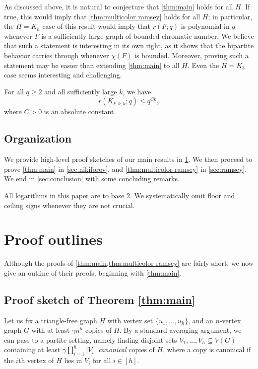 \documentclass[11pt]{article}
\numberwithin{equation}{section}
\theoremstyle{plain}
\theoremstyle{remark}
\newcommand\ab[1]{\lvert #1 \rvert}
\begin{document}
As discussed above, it is natural to conjecture that \cref{thm:main} holds for all $H$. If true, this would imply that \cref{thm:multicolor ramsey} holds for all $H$; in particular, the $H=K_h$ case of this result would imply that $r(F;q)$ is polynomial in $q$ whenever $F$ is a sufficiently large graph of bounded chromatic number. We believe that such a statement is interesting in its own right, as it shows that the bipartite behavior carries through whenever $\chi(F)$ is bounded. Moreover, proving such a statement may be easier than extending \cref{thm:main} to all $H$. Even the $H=K_3$ case seems interesting and challenging.
\begin{conjecture}
    For all $q \geq 2$ and all sufficiently large $k$, we have
    \[
        r(K_{k,k,k};q) \leq q^{Ck},
    \]
    where $C>0$ is an absolute constant.
\end{conjecture}

\subsection{Organization}
We provide high-level proof sketches of our main results in \cref{sec:outlines}.
We then proceed to prove \cref{thm:main} in \cref{sec:nikiforov}, and \cref{thm:multicolor ramsey} in \cref{sec:ramsey}. We end in \cref{sec:conclusion} with some concluding remarks.

All logarithms in this paper are to base $2$. We systematically omit floor and ceiling signs whenever they are not crucial.

\section{Proof outlines}\label{sec:outlines}
Although the proofs of \cref{thm:main,thm:multicolor ramsey} are fairly short, we now give an outline of their proofs, beginning with \cref{thm:main}. 
\subsection{Proof sketch of Theorem \ref{thm:main}}
Let us fix a triangle-free graph $H$ with vertex set $\{u_1,\dots,u_h\}$, and an $n$-vertex graph $G$ with at least $\gamma n^h$ copies of $H$. By a standard averaging argument, we can pass to a partite setting, namely finding disjoint sets $V_1,\dots,V_h \subseteq V(G)$ containing at least $\gamma \prod_{i=1}^h \ab{V_i}$ \emph{canonical} copies of $H$, where a copy is canonical if the $i$th vertex of $H$ lies in $V_i$ for all $i \in [h]$.
\end{document}
